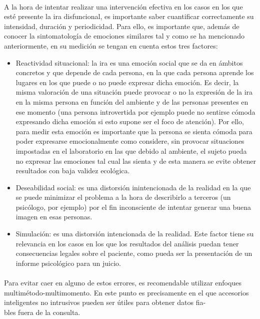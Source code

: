 \paragraph{}
A la hora de intentar realizar una intervención efectiva en los casos en los que esté presente la ira disfuncional, es importante saber cuantificar correctamente su intensidad, duración y periodicidad. Para ello, es importante que, además de conocer la sintomatología de emociones similares tal y como se ha mencionado anteriormente, en su medición se tengan en cuenta estos tres factores:
\begin{itemize}
    \item Reactividad situacional: la ira es una emoción social que se da en ámbitos concretos y que depende de cada persona, en la que cada persona aprende los lugares en los que puede o no puede expresar dicha emoción. Es decir, la misma valoración de una situación puede provocar o no la expresión de la ira en la misma persona en función del ambiente y de las personas presentes en ese momento (una persona introvertida por ejemplo puede no sentirse cómoda expresando dicha emoción si esto supone ser el foco de atención). Por ello, para medir esta emoción es importante que la persona se sienta cómoda para poder expresarse emocionalmente como considere, sin provocar situaciones impostadas en el laboratorio en las que debido al ambiente, el sujeto pueda no expresar las emociones tal cual las sienta y de esta manera se evite obtener resultados con baja validez ecológica.
    
    \item Deseabilidad social: es una distorsión inintencionada de la realidad en la que se puede minimizar el problema a la hora de describirlo a terceros (un psicólogo, por ejemplo) por el fin inconsciente de intentar generar una buena imagen en esas personas.
    
    \item Simulación: es una distorsión intencionada de la realidad. Este factor tiene su relevancia en los casos en los que los resultados del análisis puedan tener consecuencias legales sobre el paciente, como pueda ser la presentación de un informe psicológico para un juicio.
\end{itemize}

\paragraph{}
Para evitar caer en alguno de estos errores, es recomendable utilizar enfoques multimétodo-multimomento. En este punto es precisamente en el que accesorios inteligentes no intrusivos pueden ser útiles para obtener datos fia-\\bles fuera de la consulta.


